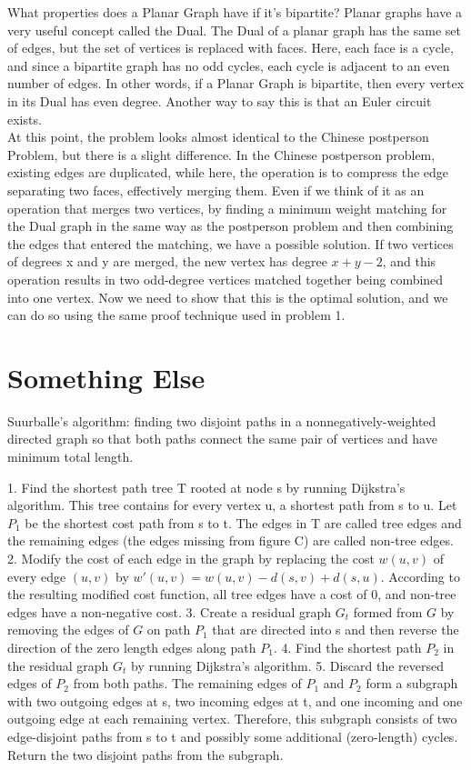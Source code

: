 \begin{itemize}
What properties does a Planar Graph have if it's bipartite? Planar graphs have a very useful concept called the Dual. The Dual of a planar graph has the same set of edges, but the set of vertices is replaced with faces. Here, each face is a cycle, and since a bipartite graph has no odd cycles, each cycle is adjacent to an even number of edges. In other words, if a Planar Graph is bipartite, then every vertex in its Dual has even degree. Another way to say this is that an Euler circuit exists.\\
At this point, the problem looks almost identical to the Chinese postperson Problem, but there is a slight difference. In the Chinese postperson problem, existing edges are duplicated, while here, the operation is to compress the edge separating two faces, effectively merging them. Even if we think of it as an operation that merges two vertices, by finding a minimum weight matching for the Dual graph in the same way as the postperson problem and then combining the edges that entered the matching, we have a possible solution. If two vertices of degrees x and y are merged, the new vertex has degree $x+y-2$, and this operation results in two odd-degree vertices matched together being combined into one vertex. Now we need to show that this is the optimal solution, and we can do so using the same proof technique used in problem 1.
\end{itemize}

\section{Something Else}
Suurballe's algorithm: finding two disjoint paths in a nonnegatively-weighted directed graph so that both paths connect the same pair of vertices and have minimum total length.

1. Find the shortest path tree T rooted at node s by running Dijkstra's algorithm. This tree contains for every vertex u, a shortest path from s to u. Let $P_1$ be the shortest cost path from s to t. The edges in T are called tree edges and the remaining edges (the edges missing from figure C) are called non-tree edges.
2. Modify the cost of each edge in the graph by replacing the cost $w(u,v)$ of every edge $(u,v)$ by $w'(u, v) = w(u, v) - d(s, v) + d(s, u)$. According to the resulting modified cost function, all tree edges have a cost of 0, and non-tree edges have a non-negative cost.
3. Create a residual graph $G_t$ formed from $G$ by removing the edges of $G$ on path $P_1$ that are directed into s and then reverse the direction of the zero length edges along path $P_1$.
4. Find the shortest path $P_2$ in the residual graph $G_t$ by running Dijkstra's algorithm.
5. Discard the reversed edges of $P_2$ from both paths. The remaining edges of $P_1$ and $P_2$ form a subgraph with two outgoing edges at s, two incoming edges at t, and one incoming and one outgoing edge at each remaining vertex. Therefore, this subgraph consists of two edge-disjoint paths from s to t and possibly some additional (zero-length) cycles. Return the two disjoint paths from the subgraph.

